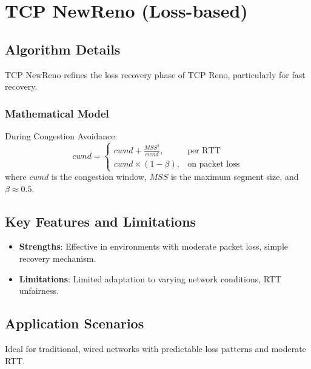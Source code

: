 \documentclass[11pt,a4paper]{article}
\begin{document}
\section{\textcolor{sectioncolor}{TCP NewReno (Loss-based)}}
\begin{tcolorbox}[colback=boxbg, colframe=boxborder, title=TCP NewReno Overview]
\subsection{{Algorithm Details}}
TCP NewReno refines the loss recovery phase of TCP Reno, particularly for fast recovery.

\subsubsection*{Mathematical Model}
During Congestion Avoidance:
\begin{equation}
cwnd = 
\begin{cases}
cwnd + \frac{MSS^2}{cwnd}, & \text{per RTT} \\
cwnd \times (1 - \beta), & \text{on packet loss}
\end{cases}
\end{equation}
where $cwnd$ is the congestion window, $MSS$ is the maximum segment size, and $\beta \approx 0.5$.

\subsection{\textcolor{textColor}{Key Features and Limitations}}
\begin{itemize}
    \item \textbf{Strengths}: Effective in environments with moderate packet loss, simple recovery mechanism.
    \item \textbf{Limitations}: Limited adaptation to varying network conditions, RTT unfairness.
\end{itemize}

\subsection{{Application Scenarios}}
Ideal for traditional, wired networks with predictable loss patterns and moderate RTT.
\end{tcolorbox}


\end{document}
